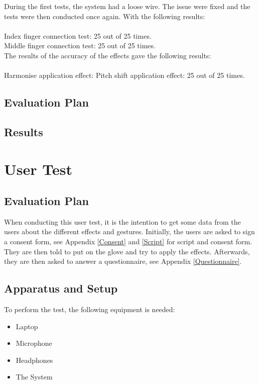 During the first tests, the system had a loose wire. The issue were fixed and the tests were then conducted once again. With the following results:\\\\

Index finger connection test: 25 out of 25 times. \\
Middle finger connection test: 25 out of 25 times. \\

The results of the accuracy of the effects gave the following results:\\\\

Harmonise application effect: 
Pitch shift application effect: 25 out of 25 times. 

\subsection{Evaluation Plan}

\subsection{Results}


\section{User Test}

\subsection{Evaluation Plan}

When conducting this user test, it is the intention to get some data from the users about the different effects and gestures. 
Initially, the users are asked to sign a consent form, see Appendix \ref{Consent} and \ref{Script} for script and consent form. They are then told to put on the glove and try to apply the effects. Afterwards, they are then asked to answer a questionnaire, see Appendix \ref{Questionnaire}. 

\subsection{Apparatus and Setup}

To perform the test, the following equipment is needed:
\begin{itemize}
 \item Laptop
 \item Microphone
 \item Headphones
 \item The System
\end{itemize}

